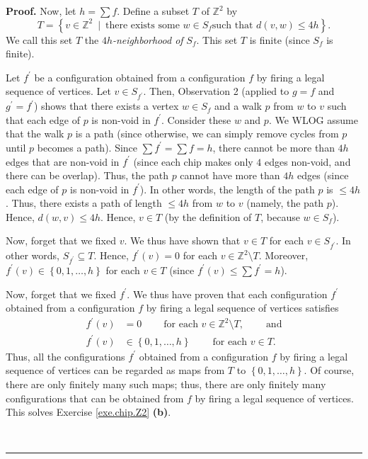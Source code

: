 \documentclass[numbers=enddot,12pt,final,onecolumn,notitlepage]{scrartcl}%
\theoremstyle{definition}
\newenvironment{proof}[1][Proof]{\noindent\textbf{#1.} }{\ \rule{0.5em}{0.5em}}
\let\sumnonlimits\sum
\renewcommand{\sum}{\sumnonlimits\limits}
\begin{document}
\begin{proof}
Now, let $h=\sum f$. Define a subset $T$ of $\mathbb{Z}^{2}$ by%
\[
T=\left\{  v\in\mathbb{Z}^{2}\ \mid\ \text{there exists some }w\in S_{f}\text{
such that }d\left(  v,w\right)  \leq4h\right\}  .
\]
We call this set $T$ the $4h$\textit{-neighborhood of }$S_{f}$. This set $T$
is finite (since $S_{f}$ is finite).

Let $f^{\prime}$ be a configuration obtained from a configuration $f$ by
firing a legal sequence of vertices. Let $v\in S_{f^{\prime}}$. Then,
Observation 2 (applied to $g=f$ and $g^{\prime}=f^{\prime}$) shows that there
exists a vertex $w\in S_{f}$ and a walk $p$ from $w$ to $v$ such that each
edge of $p$ is non-void in $f^{\prime}$. Consider these $w$ and $p$. We WLOG
assume that the walk $p$ is a path (since otherwise, we can simply remove
cycles from $p$ until $p$ becomes a path). Since $\sum f^{\prime}=\sum f=h$,
there cannot be more than $4h$ edges that are non-void in $f^{\prime}$ (since
each chip makes only $4$ edges non-void, and there can be overlap). Thus, the
path $p$ cannot have more than $4h$ edges (since each edge of $p$ is non-void
in $f^{\prime}$). In other words, the length of the path $p$ is $\leq4h$.
Thus, there exists a path of length $\leq4h$ from $w$ to $v$ (namely, the path
$p$). Hence, $d\left(  w,v\right)  \leq4h$. Hence, $v\in T$ (by the definition
of $T$, because $w\in S_{f}$).

Now, forget that we fixed $v$. We thus have shown that $v\in T$ for each $v\in
S_{f^{\prime}}$. In other words, $S_{f^{\prime}}\subseteq T$. Hence,
$f^{\prime}\left(  v\right)  =0$ for each $v\in\mathbb{Z}^{2}\setminus T$.
Moreover, $f^{\prime}\left(  v\right)  \in\left\{  0,1,\ldots,h\right\}  $ for
each $v\in T$ (since $f^{\prime}\left(  v\right)  \leq\sum f^{\prime}=h$).

Now, forget that we fixed $f^{\prime}$. We thus have proven that each
configuration $f^{\prime}$ obtained from a configuration $f$ by firing a legal
sequence of vertices satisfies%
\begin{align*}
f^{\prime}\left(  v\right)   &  =0\ \ \ \ \ \ \ \ \ \ \text{for each }%
v\in\mathbb{Z}^{2}\setminus T,\ \ \ \ \ \ \ \ \ \ \text{and}\\
f^{\prime}\left(  v\right)   &  \in\left\{  0,1,\ldots,h\right\}
\ \ \ \ \ \ \ \ \ \ \text{for each }v\in T.
\end{align*}
Thus, all the configurations $f^{\prime}$ obtained from a configuration $f$ by
firing a legal sequence of vertices can be regarded as maps from $T$ to
$\left\{  0,1,\ldots,h\right\}  $. Of course, there are only finitely many
such maps; thus, there are only finitely many configurations that can be
obtained from $f$ by firing a legal sequence of vertices. This solves Exercise
\ref{exe.chip.Z2} \textbf{(b)}.


\end{proof}
\end{document}
